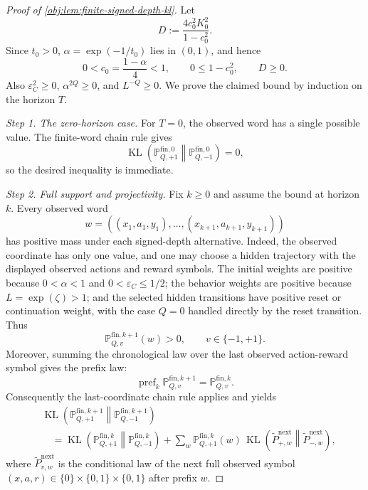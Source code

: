 \documentclass[11pt]{article}
\begin{document}
\begin{proof}[Proof of \cref{obj:lem:finite-signed-depth-kl}]
Let
\[
D:=\frac{4c_0^2K_0^2}{1-c_0^2}.
\]
Since \(t_0>0\), \(\alpha=\exp(-1/t_0)\) lies in \((0,1)\), and hence
\[
0<c_0=\frac{1-\alpha}{4}<1,\qquad 0\le 1-c_0^2,\qquad D\ge 0 .
\]
Also \(\varepsilon_C^2\ge 0\), \(\alpha^{2Q}\ge 0\), and \(L^{-Q}\ge 0\).  We prove the claimed bound by induction on the horizon \(T\). %

\emph{Step 1. The zero-horizon case.}
For \(T=0\), the observed word has a single possible value.  The finite-word chain rule gives
\[
\operatorname{KL}\!\left(\mathbb P_{Q,+1}^{\mathrm{fin},0}\middle\|
\mathbb P_{Q,-1}^{\mathrm{fin},0}\right)=0,
\]
so the desired inequality is immediate. %

\emph{Step 2. Full support and projectivity.}
Fix \(k\ge 0\) and assume the bound at horizon \(k\).  Every observed word
\[
w=((x_1,a_1,y_1),\ldots,(x_{k+1},a_{k+1},y_{k+1}))
\]
has positive mass under each signed-depth alternative.  Indeed, the observed coordinate has only one value, and one may choose a hidden trajectory with the displayed observed actions and reward symbols.  The initial weights are positive because \(0<\alpha<1\) and \(0<\varepsilon_C\le 1/2\); the behavior weights are positive because \(L=\exp(\zeta)>1\); and the selected hidden transitions have positive reset or continuation weight, with the case \(Q=0\) handled directly by the reset transition.  Thus
\[
\mathbb P_{Q,v}^{\mathrm{fin},k+1}(w)>0,
\qquad v\in\{-1,+1\}.
\]
Moreover, summing the chronological law over the last observed action-reward symbol gives the prefix law:
\[
\operatorname{pref}_k\mathbb P_{Q,v}^{\mathrm{fin},k+1}
=
\mathbb P_{Q,v}^{\mathrm{fin},k}.
\]
Consequently the last-coordinate chain rule applies and yields
\[
\begin{aligned}
&\operatorname{KL}\!\left(\mathbb P_{Q,+1}^{\mathrm{fin},k+1}
 \middle\|\mathbb P_{Q,-1}^{\mathrm{fin},k+1}\right)  \\
&\quad =
\operatorname{KL}\!\left(\mathbb P_{Q,+1}^{\mathrm{fin},k}
 \middle\|\mathbb P_{Q,-1}^{\mathrm{fin},k}\right)
+
\sum_{w}
\mathbb P_{Q,+1}^{\mathrm{fin},k}(w)\,
\operatorname{KL}\!\left(\widetilde P_{+,w}^{\mathrm{next}}\middle\|\widetilde P_{-,w}^{\mathrm{next}}\right),
\end{aligned}
\]
where \(\widetilde P_{v,w}^{\mathrm{next}}\) is the conditional law of the next full observed symbol \((x,a,r)\in\{0\}\times\{0,1\}\times\{0,1\}\) after prefix \(w\). %


\end{proof}
\end{document}
